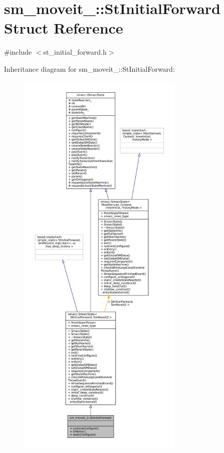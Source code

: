 \hypertarget{structsm__moveit__2_1_1StInitialForward}{}\section{sm\+\_\+moveit\+\_\+:\+:St\+Initial\+Forward Struct Reference}
\label{structsm__moveit__2_1_1StInitialForward}


{\ttfamily \#include $<$st\+\_\+initial\+\_\+forward.\+h$>$}



Inheritance diagram for sm\+\_\+moveit\+\_\+:\+:St\+Initial\+Forward\+:
\nopagebreak
\begin{figure}[H]
\begin{center}
\leavevmode
\includegraphics[height=550pt]{structsm__moveit__2_1_1StInitialForward__inherit__graph}
\end{center}
\end{figure}


